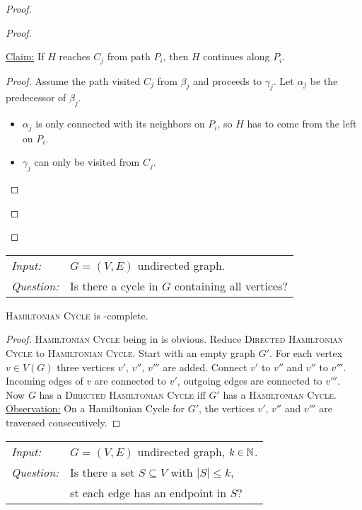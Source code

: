 \documentclass[../skript.tex]{subfiles}
\begin{document}
\begin{proof}
\begin{proof}
\begin{itemize}
\underline{Claim:} If $H$ reaches $C_j$ from path $P_i$, then $H$ continues along $P_i$.
\begin{proof}
Assume the path visited $C_j$ from $\beta_j$ and proceeds to $\gamma_j$. Let $\alpha_j$ be the predecessor of $\beta_j$.
\begin{itemize}
\item $\alpha_j$ is only connected with its neighbors on $P_i$, so $H$ has to come from the left on $P_i$.
\item $\gamma_j$ can only be visited from $C_j$.
\end{itemize}
\end{proof}
\end{itemize}
\end{proof}
\end{proof}
\begin{problem}
\begin{tabular}{ll}
\textit{Input:} & $G = (V, E)$ undirected graph. \\
\textit{Question:} & Is there a cycle in $G$ containing all vertices?
\end{tabular}
\end{problem}
\begin{theorem} %
\label{thm:7}
\textsc{Hamiltonian Cycle} is \NP-complete.
\end{theorem}
\begin{proof}
\textsc{Hamiltonian Cycle} being in \NP{} is obvious.
Reduce \textsc{Directed Hamiltonian Cycle} to \textsc{Hamiltonian Cycle}.
Start with an empty graph $G'$. For each vertex $v \in V(G)$ three vertices $v'$, $v''$, $v'''$ are added. Connect $v'$ to $v''$ and $v''$ to $v'''$. Incoming edges of $v$ are connected to $v'$, outgoing edges are connected to $v'''$.
Now $G$ has a \textsc{Directed Hamiltonian Cycle} \ac{iff} $G'$ has a \textsc{Hamiltonian Cycle}. \\
\underline{Observation:} On a Hamiltonian Cycle for $G'$, the vertices $v'$, $v''$ and $v'''$ are traversed consecutively.
\end{proof}
\begin{problem}
\begin{tabular}{ll}
\textit{Input:} & $G = (V, E)$ undirected graph, $k \in \mathbb{N}$. \\
\textit{Question:} & Is there a set $S \subseteq V$ with $|S| \leq k$, \\
& \ac{st} each edge has an endpoint in $S$?
\end{tabular}
\end{problem}
\end{document}
